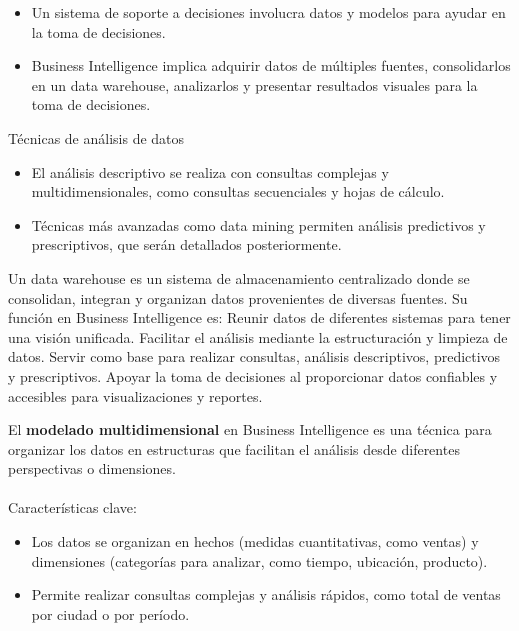 \documentclass[11pt,letterpaper]{article}
\begin{document}
\begin{itemize}
	\item Un sistema de soporte a decisiones involucra datos y modelos para ayudar
en la toma de decisiones.
\end{itemize}


\begin{itemize}
	\item Business Intelligence implica adquirir datos de múltiples fuentes,
consolidarlos en un data warehouse, analizarlos y presentar resultados visuales
para la toma de decisiones.
\end{itemize}
Técnicas de análisis de datos

\begin{itemize}
	\item El análisis descriptivo se realiza con consultas complejas y
multidimensionales, como consultas secuenciales y hojas de cálculo.
\end{itemize}


\begin{itemize}
	\item Técnicas más avanzadas como data mining permiten análisis predictivos y
prescriptivos, que serán detallados posteriormente.
\end{itemize}
Un data warehouse es un sistema de almacenamiento centralizado donde se
consolidan, integran y organizan datos provenientes de diversas fuentes. Su
función en Business Intelligence es: Reunir datos de diferentes sistemas para
tener una visión unificada. Facilitar el análisis mediante la estructuración y
limpieza de datos. Servir como base para realizar consultas, análisis
descriptivos, predictivos y prescriptivos. Apoyar la toma de decisiones al
proporcionar datos confiables y accesibles para visualizaciones y reportes.

El \textbf{modelado multidimensional} en Business Intelligence es una técnica
para organizar los datos en estructuras que facilitan el análisis desde
diferentes perspectivas o dimensiones.  \\ \\
Características clave:

\begin{itemize}
	\item Los datos se organizan en hechos (medidas cuantitativas, como ventas) y
dimensiones (categorías para analizar, como tiempo, ubicación, producto).
\end{itemize}


\begin{itemize}
	\item Permite realizar consultas complejas y análisis rápidos, como total de
ventas por ciudad o por período.
\end{itemize}
\end{document}

